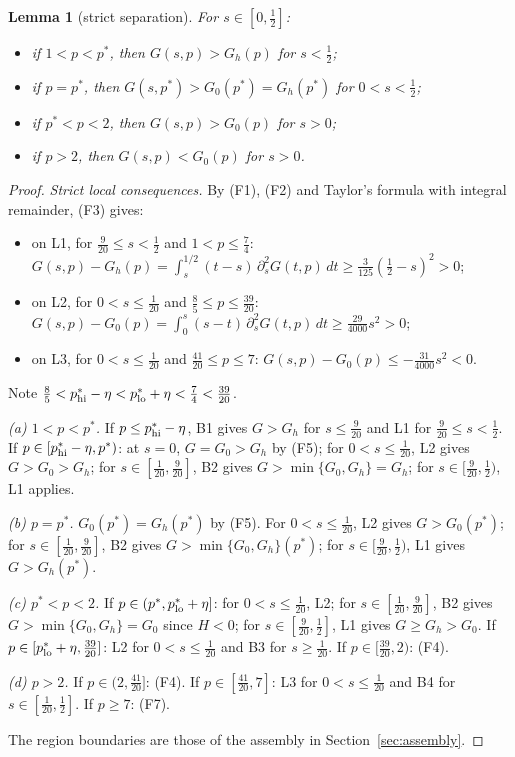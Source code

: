 \documentclass[11pt]{article}
\newtheorem{lemmaL}{Lemma}
\theoremstyle{remark}
\begin{document}
\setcounter{lemmaL}{18}
\begin{lemmaL}[strict separation]\label{lem:S}
For $s\in[0,\frac12]$:
\begin{itemize}
\item[(a)] if $1<p<p^*$, then $G(s,p)>G_h(p)$ for $s<\frac12$;
\item[(b)] if $p=p^*$, then $G(s,p^*)>G_0(p^*)=G_h(p^*)$ for $0<s<\frac12$;
\item[(c)] if $p^*<p<2$, then $G(s,p)>G_0(p)$ for $s>0$;
\item[(d)] if $p>2$, then $G(s,p)<G_0(p)$ for $s>0$.
\end{itemize}
\end{lemmaL}
\begin{proof}
\emph{Strict local consequences.} By (F1), (F2) and Taylor's formula with integral remainder, (F3) gives:
\begin{itemize}
\item on L1, for $\frac9{20}\le s<\frac12$ and $1<p\le\frac74$: $G(s,p)-G_h(p)=\int_s^{1/2}(t-s)\,\partial_s^2G(t,p)\,dt\ge\frac3{125}(\frac12-s)^2>0$;
\item on L2, for $0<s\le\frac1{20}$ and $\frac85\le p\le\frac{39}{20}$: $G(s,p)-G_0(p)=\int_0^s(s-t)\,\partial_s^2G(t,p)\,dt\ge\frac{29}{4000}s^2>0$;
\item on L3, for $0<s\le\frac1{20}$ and $\frac{41}{20}\le p\le7$: $G(s,p)-G_0(p)\le-\frac{31}{4000}s^2<0$.
\end{itemize}
Note $\frac85<p^*_{\rm hi}-\eta<p^*_{\rm lo}+\eta<\frac74<\frac{39}{20}$.

\emph{(a) $1<p<p^*$.} If $p\le p^*_{\rm hi}-\eta$, B1 gives $G>G_h$ for $s\le\frac9{20}$ and L1 for $\frac9{20}\le s<\frac12$. If $p\in[p^*_{\rm hi}-\eta,p^*)$: at $s=0$, $G=G_0>G_h$ by (F5); for $0<s\le\frac1{20}$, L2 gives $G>G_0>G_h$; for $s\in[\frac1{20},\frac9{20}]$, B2 gives $G>\min\{G_0,G_h\}=G_h$; for $s\in[\frac9{20},\frac12)$, L1 applies.

\emph{(b) $p=p^*$.} $G_0(p^*)=G_h(p^*)$ by (F5). For $0<s\le\frac1{20}$, L2 gives $G>G_0(p^*)$; for $s\in[\frac1{20},\frac9{20}]$, B2 gives $G>\min\{G_0,G_h\}(p^*)$; for $s\in[\frac9{20},\frac12)$, L1 gives $G>G_h(p^*)$.

\emph{(c) $p^*<p<2$.} If $p\in(p^*,p^*_{\rm lo}+\eta]$: for $0<s\le\frac1{20}$, L2; for $s\in[\frac1{20},\frac9{20}]$, B2 gives $G>\min\{G_0,G_h\}=G_0$ since $H<0$; for $s\in[\frac9{20},\frac12]$, L1 gives $G\ge G_h>G_0$. If $p\in[p^*_{\rm lo}+\eta,\frac{39}{20}]$: L2 for $0<s\le\frac1{20}$ and B3 for $s\ge\frac1{20}$. If $p\in[\frac{39}{20},2)$: (F4).

\emph{(d) $p>2$.} If $p\in(2,\frac{41}{20}]$: (F4). If $p\in[\frac{41}{20},7]$: L3 for $0<s\le\frac1{20}$ and B4 for $s\in[\frac1{20},\frac12]$. If $p\ge7$: (F7).

The region boundaries are those of the assembly in Section~\ref{sec:assembly}.
\end{proof}
\end{document}
